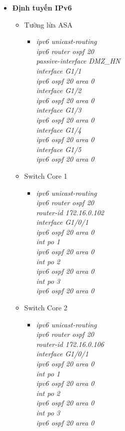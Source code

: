 \documentclass[12pt,a4paper]{report}
\begin{document}
\begin{itemize}
       \item \textbf{Định tuyến IPv6}
      \begin{itemize}
        \item Tường lửa ASA 
        \begin{itemize}
          \item \textit{ipv6 unicast-routing\\
ipv6 router ospf 20\\
passive-interface DMZ\_HN\\
interface G1/1\\
ipv6 ospf 20 area 0\\
interface G1/2\\
ipv6 ospf 20 area 0\\
interface G1/3\\
ipv6 ospf 20 area 0\\
interface G1/4\\
ipv6 ospf 20 area 0\\
interface G1/5\\
ipv6 ospf 20 area 0\\}
       
        \end{itemize}
       
            \item Switch Core 1
           
        \begin{itemize}
         \item \textit{ipv6 unicast-routing\\
ipv6 router ospf 20\\
router-id 172.16.0.102\\
interface G1/0/1\\
ipv6 ospf 20 area 0\\
int po 1\\
ipv6 ospf 20 area 0\\
int po 2\\
ipv6 ospf 20 area 0\\
int po 3\\
ipv6 ospf 20 area 0\\}
        
          \end{itemize}
             \item Switch Core 2
           
        \begin{itemize}
         \item \textit{ipv6 unicast-routing\\
ipv6 router ospf 20\\
router-id 172.16.0.106\\
interface G1/0/1\\
ipv6 ospf 20 area 0\\
int po 1\\
ipv6 ospf 20 area 0\\
int po 2\\
ipv6 ospf 20 area 0\\
int po 3\\
ipv6 ospf 20 area 0\\}
        

\end{itemize}
\end{itemize}
\end{itemize}
\end{document}
